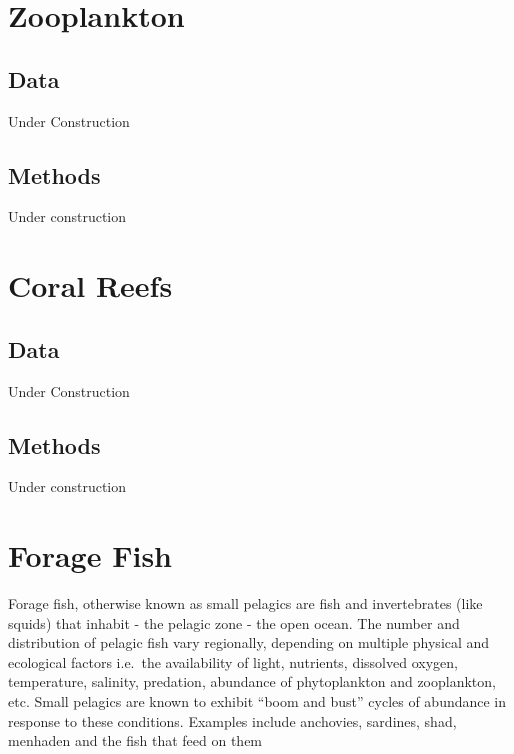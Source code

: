 \documentclass[
]{book}
\begin{document}
\hypertarget{zooplankton}{%
\chapter{Zooplankton}\label{zooplankton}}

\hypertarget{data-1}{%
\section{Data}\label{data-1}}

Under Construction

\hypertarget{methods-1}{%
\section{Methods}\label{methods-1}}

Under construction

\hypertarget{coral-reefs}{%
\chapter{Coral Reefs}\label{coral-reefs}}

\hypertarget{data-2}{%
\section{Data}\label{data-2}}

Under Construction

\hypertarget{methods-2}{%
\section{Methods}\label{methods-2}}

Under construction

\hypertarget{forage-fish}{%
\chapter{Forage Fish}\label{forage-fish}}

Forage fish, otherwise known as small pelagics are fish and invertebrates (like squids) that inhabit - the pelagic zone - the open ocean. The number and distribution of pelagic fish vary regionally, depending on multiple physical and ecological factors i.e.~the availability of light, nutrients, dissolved oxygen, temperature, salinity, predation, abundance of phytoplankton and zooplankton, etc. Small pelagics are known to exhibit ``boom and bust'' cycles of abundance in response to these conditions. Examples include anchovies, sardines, shad, menhaden and the fish that feed on them
\end{document}
